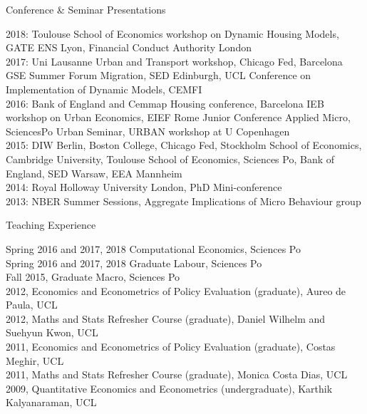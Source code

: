 \documentclass{cvjobmarket} %
\begin{document}

\begin{rSection}{Conference \& Seminar Presentations}

{2018: Toulouse School of Economics workshop on Dynamic Housing Models, GATE ENS Lyon, Financial Conduct Authority London}\\
{2017: Uni Lausanne Urban and Transport workshop, Chicago Fed, Barcelona GSE Summer Forum Migration, SED Edinburgh, UCL Conference on Implementation of Dynamic Models, CEMFI}\\
{2016: Bank of England and Cemmap Housing conference, Barcelona IEB workshop on Urban Economics, EIEF Rome Junior Conference Applied Micro, SciencesPo Urban Seminar, URBAN workshop at U Copenhagen}\\
{2015: DIW Berlin, Boston College, Chicago Fed, Stockholm School of Economics, Cambridge University, Toulouse School of Economics, Sciences Po, Bank of England, SED Warsaw, EEA Mannheim}\\
{2014: Royal Holloway University London, PhD Mini-conference}\\
{2013: NBER Summer Sessions, Aggregate Implications of Micro Behaviour group}\\

\end{rSection}

\begin{rSection}{Teaching Experience}

{Spring 2016 and 2017, 2018 Computational Economics, Sciences Po}\\
{Spring 2016 and 2017, 2018 Graduate Labour, Sciences Po}\\
{Fall 2015, Graduate Macro, Sciences Po}\\
{2012, Economics and Econometrics of Policy Evaluation (graduate), Aureo de Paula, UCL}\\
{2012, Maths and Stats Refresher Course (graduate), Daniel Wilhelm and Suehyun Kwon, UCL}\\
{2011, Economics and Econometrics of Policy Evaluation (graduate), Costas Meghir, UCL}\\
{2011, Maths and Stats Refresher Course (graduate), Monica Costa Dias, UCL }\\
{2009, Quantitative Economics and Econometrics (undergraduate), Karthik Kalyanaraman, UCL}\\

\end{rSection}
\end{document}
